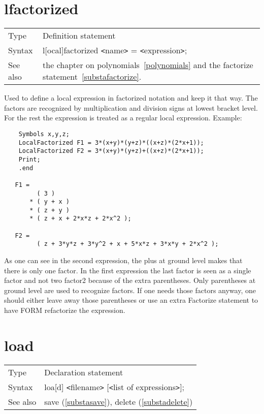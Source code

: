 
\section{lfactorized}
\label{substalfactorized}

\noindent \begin{tabular}{ll}
Type & Definition statement\\
Syntax & l[ocal]factorized {\tt<}name{\tt>} = {\tt<}expression{\tt>};
\\ See also & the chapter on polynomials~\ref{polynomials} and the 
factorize statement~\ref{substafactorize}.
\end{tabular} \vspace{4mm}

\noindent Used to define a local expression in factorized 
notation and keep it that way. The factors are recognized by multiplication 
and division signs at lowest bracket level. For the rest the expression is 
treated as a regular local expression. Example:
\begin{verbatim}
    Symbols x,y,z;
    LocalFactorized F1 = 3*(x+y)*(y+z)*((x+z)*(2*x+1));
    LocalFactorized F2 = 3*(x+y)*(y+z)+((x+z)*(2*x+1));
    Print;
    .end

   F1 =
         ( 3 )
       * ( y + x )
       * ( z + y )
       * ( z + x + 2*x*z + 2*x^2 );

   F2 =
         ( z + 3*y*z + 3*y^2 + x + 5*x*z + 3*x*y + 2*x^2 );
\end{verbatim}
\noindent As one can see in the second expression, the plus at ground level 
makes that there is only one factor. In the first expression the last 
factor is seen as a single factor and not two factor2 because of the extra 
parentheses. Only parentheses at ground level are used to recognize 
factors. If one needs those factors anyway, one should either leave away 
those parentheses or use an extra Factorize statement to have FORM 
refactorize the expression.
\vspace{10mm}


\section{load}
\label{substaload}

\noindent \begin{tabular}{ll}
Type & Declaration statement\\
Syntax & loa[d] {\tt<}filename{\tt>} [{\tt<}list of expressions{\tt>}];
\\ See also & save (\ref{substasave}), delete (\ref{substadelete})
\end{tabular} \vspace{4mm}

